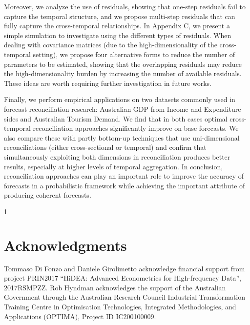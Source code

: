\documentclass[a4paper,11pt]{article}
\newcommand{\blind}{1}
\theoremstyle{definition}
\begin{document}
Moreover, we analyze the use of residuals, showing that one-step residuals fail to capture the temporal structure, and we propose multi-step residuals that can fully capture the cross-temporal relationships. In Appendix C, we present a simple simulation to investigate using the different types of residuals. When dealing with covariance matrices (due to the high-dimensionality of the cross-temporal setting), we propose four alternative forms to reduce the number of parameters to be estimated, showing that the overlapping residuals may reduce the high-dimensionality burden by increasing the number of available residuals. These ideas are worth requiring further investigation in future works.

Finally, we perform empirical applications on two datasets commonly used in forecast reconciliation research: Australian GDP from Income and Expenditure sides and Australian Tourism Demand. We find that in both cases optimal cross-temporal reconciliation approaches significantly improve on base forecasts. We also compare these with partly bottom-up techniques that use uni-dimensional reconciliations (either cross-sectional or temporal) and confirm that simultaneously exploiting both dimensions in reconciliation produces better results, especially at higher levels of temporal aggregation. In conclusion, reconciliation approaches can play an important role to improve the accuracy of forecasts in a probabilistic framework while achieving the important attribute of producing coherent forecasts.

\appendix
\setcounter{table}{0}
\renewcommand{\thetable}{\Alph{section}.\arabic{table}}

\blind
{
\section*{Acknowledgments}

\noindent Tommaso Di Fonzo and Daniele Girolimetto acknowledge financial support from project PRIN2017 “HiDEA: Advanced Econometrics for High-frequency Data”, 2017RSMPZZ. Rob Hyndman acknowledges the support of the Australian Government through the Australian Research Council Industrial Transformation Training Centre in Optimisation Technologies, Integrated Methodologies, and Applications (OPTIMA), Project ID IC200100009.
} \fi




\end{document}
